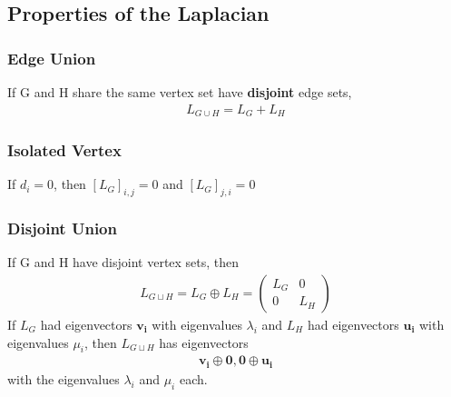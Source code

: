\documentclass[12pt, letterpaper]{report}
\begin{document}
    \subsection{Properties of the Laplacian}
    \subsubsection{Edge Union} If G and H share the same vertex set have \textbf{disjoint} edge sets,
    \begin{gather*}
        L_{G \cup H} = L_G + L_H
    \end{gather*}
    \subsubsection{Isolated Vertex} If $d_i = 0$, then $[L_G]_{i,j} = 0$ and $[L_G]_{j,i} = 0$\\
    \subsubsection{Disjoint Union} If G and H have disjoint vertex sets, then
    \begin{gather*}
        L_{G \sqcup H} = L_G \oplus L_H = 
        \begin{pmatrix}
            L_G & 0\\
            0 & L_H
        \end{pmatrix}
    \end{gather*}
    If $L_G$ had eigenvectors $\mathbf{v_i}$ with eigenvalues $\lambda_i$ and $L_H$ had eigenvectors $\mathbf{u_i}$ with eigenvalues $\mu_i$, then $L_{G \sqcup H}$ has eigenvectors
    \begin{gather*}
        \mathbf{v_i}\oplus \mathbf{0}, \mathbf{0}\oplus \mathbf{u_i}
    \end{gather*}
    with the eigenvalues $\lambda_i$ and $\mu_i$ each.
\end{document}
